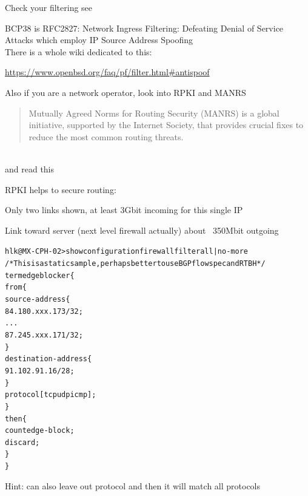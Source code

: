 \documentclass[Screen16to9,17pt]{foils}
\begin{document}

Check your filtering see
\begin{list2}
\item BCP38 is RFC2827: Network Ingress Filtering: Defeating Denial of Service Attacks which employ IP Source Address Spoofing\\
There is a whole wiki dedicated to this:
\item {}
\item {}
\item \url{https://www.openbsd.org/faq/pf/filter.html#antispoof}
\end{list2}

Also if you are a network operator, look into RPKI and MANRS

\begin{quote}
  Mutually Agreed Norms for Routing Security (MANRS) is a global initiative, supported by the Internet Society, that provides crucial fixes to reduce the most common routing threats.
\end{quote}

\\
and read this\\ {\small{}}

RPKI helps to secure routing:






\centerline{Only two links shown, at least 3Gbit incoming for this single IP}

\centerline{Link toward server (next level firewall actually) about ~350Mbit outgoing}



\begin{alltt}\footnotesize
hlk@MX-CPH-02> show configuration firewall filter all | no-more
/* This is a static sample, perhaps better to use BGP flowspec and RTBH */
term edgeblocker \{
    from \{
        source-address \{
            84.180.xxx.173/32;
...
            87.245.xxx.171/32;
        \}
        destination-address \{
            91.102.91.16/28;
        \}
        protocol [ tcp udp icmp ];
    \}
    then \{
        count edge-block;
        discard;
    \}
\}
\end{alltt}
Hint: can also leave out protocol and then it will match all protocols
\end{document}

